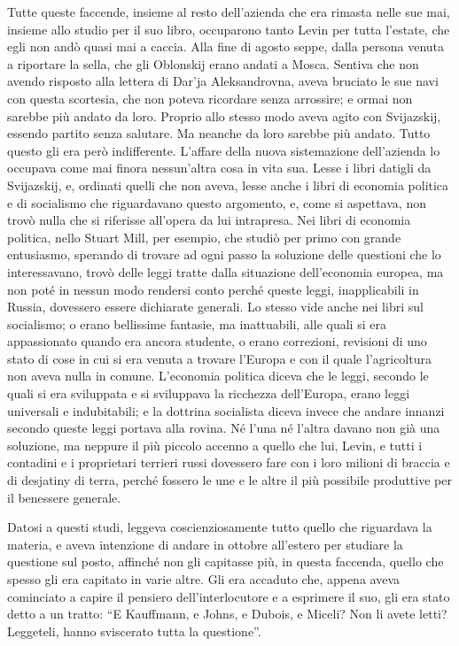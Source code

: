 Tutte queste faccende, insieme al resto dell'azienda che era rimasta nelle sue mai, insieme allo studio per il suo libro, occuparono tanto Levin per tutta l'estate, che egli non andò quasi mai a caccia. Alla fine di agosto seppe, dalla persona venuta a riportare la sella, che gli Oblonskij erano andati a Mosca. Sentiva che non avendo risposto alla lettera di Dar'ja Aleksandrovna, aveva bruciato le sue navi con questa scortesia, che non poteva ricordare senza arrossire; e ormai non sarebbe più andato da loro. Proprio allo stesso modo aveva agito con Svijazskij, essendo partito senza salutare. Ma neanche da loro sarebbe più andato. Tutto questo gli era però indifferente. L'affare della nuova sistemazione dell'azienda lo occupava come mai finora nessun'altra cosa in vita sua. Lesse i libri datigli da Svijazskij, e, ordinati quelli che non aveva, lesse anche i libri di economia politica e di socialismo che riguardavano questo argomento, e, come si aspettava, non trovò nulla che si riferisse all'opera da lui intrapresa. Nei libri di economia politica, nello Stuart Mill, per esempio, che studiò per primo con grande entusiasmo, sperando di trovare ad ogni passo la soluzione delle questioni che lo interessavano, trovò delle leggi tratte dalla situazione dell'economia europea, ma non poté in nessun modo rendersi conto perché queste leggi, inapplicabili in Russia, dovessero essere dichiarate generali. Lo stesso vide anche nei libri sul socialismo; o erano bellissime fantasie, ma inattuabili, alle quali si era appassionato quando era ancora studente, o erano correzioni, revisioni di uno stato di cose in cui si era venuta a trovare l'Europa e con il quale l'agricoltura non aveva nulla in comune. L'economia politica diceva che le leggi, secondo le quali si era sviluppata e si sviluppava la ricchezza dell'Europa, erano leggi universali e indubitabili; e la dottrina socialista diceva invece che andare innanzi secondo queste leggi portava alla rovina. Né l'una né l'altra davano non già una soluzione, ma neppure il più piccolo accenno a quello che lui, Levin, e tutti i contadini e i proprietari terrieri russi dovessero fare con i loro milioni di braccia e di desjatiny di terra, perché fossero le une e le altre il più possibile produttive per il benessere generale. 

Datosi a questi studi, leggeva coscienziosamente tutto quello che riguardava la materia, e aveva intenzione di andare in ottobre all'estero per studiare la questione sul posto, affinché non gli capitasse più, in questa faccenda, quello che spesso gli era capitato in varie altre. Gli era accaduto che, appena aveva cominciato a capire il pensiero dell'interlocutore e a esprimere il suo, gli era stato detto a un tratto: ``E Kauffmann, e Johns, e Dubois, e Miceli? Non li avete letti? Leggeteli, hanno sviscerato tutta la questione''. 

